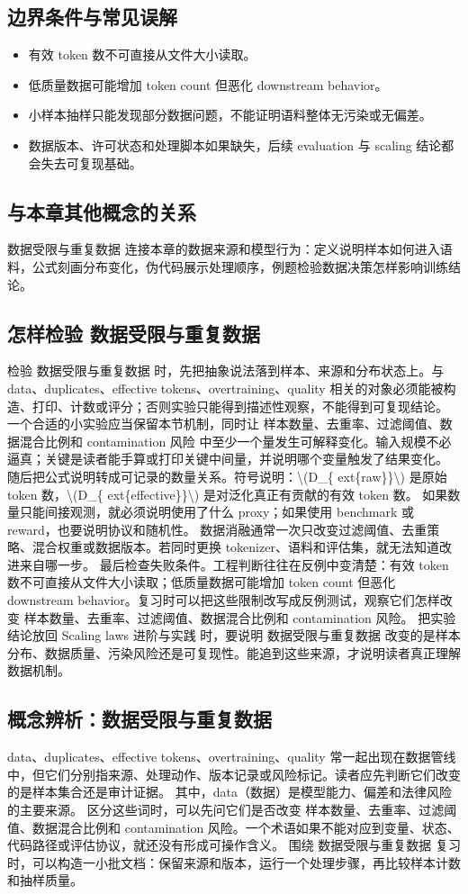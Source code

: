 \documentclass[a4paper]{article}
\begin{document}
\subsection{边界条件与常见误解}
\begin{itemize}
\item 有效 token 数不可直接从文件大小读取。
\item 低质量数据可能增加 token count 但恶化 downstream behavior。
\item 小样本抽样只能发现部分数据问题，不能证明语料整体无污染或无偏差。
\item 数据版本、许可状态和处理脚本如果缺失，后续 evaluation 与 scaling 结论都会失去可复现基础。
\end{itemize}
\subsection{与本章其他概念的关系}
数据受限与重复数据 连接本章的数据来源和模型行为：定义说明样本如何进入语料，公式刻画分布变化，伪代码展示处理顺序，例题检验数据决策怎样影响训练结论。
\subsection{怎样检验 数据受限与重复数据}
检验 数据受限与重复数据 时，先把抽象说法落到样本、来源和分布状态上。与 data、duplicates、effective tokens、overtraining、quality 相关的对象必须能被构造、打印、计数或评分；否则实验只能得到描述性观察，不能得到可复现结论。
一个合适的小实验应当保留本节机制，同时让 样本数量、去重率、过滤阈值、数据混合比例和 contamination 风险 中至少一个量发生可解释变化。输入规模不必逼真；关键是读者能手算或打印关键中间量，并说明哪个变量触发了结果变化。
随后把公式说明转成可记录的数量关系。符号说明：\textbackslash{}(D\_\{ ext\{raw\}\}\textbackslash{}) 是原始 token 数，\textbackslash{}(D\_\{ ext\{effective\}\}\textbackslash{}) 是对泛化真正有贡献的有效 token 数。 如果数量只能间接观测，就必须说明使用了什么 proxy；如果使用 benchmark 或 reward，也要说明协议和随机性。
数据消融通常一次只改变过滤阈值、去重策略、混合权重或数据版本。若同时更换 tokenizer、语料和评估集，就无法知道改进来自哪一步。
最后检查失败条件。工程判断往往在反例中变清楚：有效 token 数不可直接从文件大小读取；低质量数据可能增加 token count 但恶化 downstream behavior。复习时可以把这些限制改写成反例测试，观察它们怎样改变 样本数量、去重率、过滤阈值、数据混合比例和 contamination 风险。
把实验结论放回 Scaling laws 进阶与实践 时，要说明 数据受限与重复数据 改变的是样本分布、数据质量、污染风险还是可复现性。能追到这些来源，才说明读者真正理解数据机制。
\subsection{概念辨析：数据受限与重复数据}
data、duplicates、effective tokens、overtraining、quality 常一起出现在数据管线中，但它们分别指来源、处理动作、版本记录或风险标记。读者应先判断它们改变的是样本集合还是审计证据。
其中，data（数据）是模型能力、偏差和法律风险的主要来源。
区分这些词时，可以先问它们是否改变 样本数量、去重率、过滤阈值、数据混合比例和 contamination 风险。一个术语如果不能对应到变量、状态、代码路径或评估协议，就还没有形成可操作含义。
围绕 数据受限与重复数据 复习时，可以构造一小批文档：保留来源和版本，运行一个处理步骤，再比较样本计数和抽样质量。
\end{document}
